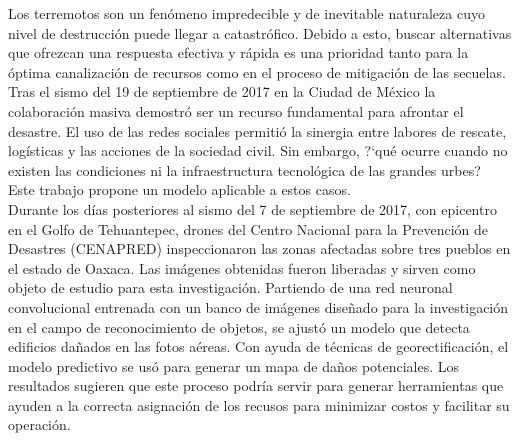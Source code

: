 Los terremotos son un fen\'omeno impredecible y de inevitable naturaleza cuyo nivel de destrucci\'on puede llegar a catastr\'ofico. Debido a esto, buscar alternativas que ofrezcan una respuesta efectiva y r\'apida es una prioridad tanto para la \'optima canalizaci\'on de recursos como en el proceso de mitigaci\'on de las secuelas.\\

Tras el sismo del 19 de septiembre de 2017 en la Ciudad de M\'exico la colaboraci\'on masiva demostr\'o ser un recurso fundamental para afrontar el desastre. El uso de las redes sociales permiti\'o la sinergia entre labores de rescate, log\'isticas y las acciones de la sociedad civil. Sin embargo, ?`qu\'e ocurre cuando no existen las condiciones ni la infraestructura tecnol\'ogica de las grandes urbes? Este trabajo propone un modelo aplicable a estos casos.\\

Durante los d\'ias posteriores al sismo del 7 de septiembre de 2017, con epicentro en el Golfo de Tehuantepec, drones del Centro Nacional para la Prevenci\'on de Desastres (CENAPRED) inspeccionaron las zonas afectadas sobre tres pueblos en el estado de Oaxaca. Las im\'agenes obtenidas fueron liberadas y sirven como objeto de estudio para esta investigaci\'on. Partiendo de una red neuronal convolucional entrenada con un banco de im\'agenes dise\~nado para la investigaci\'on en el campo de reconocimiento de objetos, se ajust\'o un modelo que detecta edificios da\~nados en las fotos a\'ereas. Con ayuda de t\'ecnicas de georectificaci\'on, el modelo predictivo se us\'o para generar un mapa de da\~nos potenciales. Los resultados sugieren que este proceso podr\'ia servir para generar herramientas que ayuden a la correcta asignaci\'on de los recusos para minimizar costos y facilitar su operaci\'on.\\